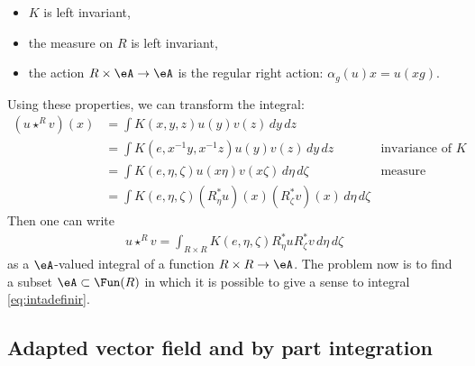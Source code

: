 \begin{itemize}
\item $K$ is left invariant,
\item the measure on $R$ is left invariant,
\item the action $R\times\eA\to\eA$ is the regular right action: $\alpha_g(u)x=u(xg)$.
\end{itemize}
Using these properties, we can transform the integral:
\[ 
  \begin{aligned}
(u\star^R v)(x)&=\int K(x,y,z)u(y)v(z)\,dy\,dz\\
		&=\int K(e,x^{-1}y,x^{-1}z)u(y)v(z)\,dy\,dz		&\textrm{invariance of $K$}\\
		&=\int K(e,\eta,\zeta)u(x\eta)v(x\zeta)\,d\eta\,d\zeta	&\textrm{measure invariance}\\
		&=\int K(e,\eta,\zeta) (R^*_{\eta}u)(x) (R^*_{\zeta}v)(x)\,d\eta\,d\zeta
\end{aligned}
\]
Then one can write
\begin{equation}  \label{eq:intadefinir}
\begin{split}
u\star^R v=\int_{R\times R} K(e,\eta,\zeta)R^*_{\eta}u R^*_{\zeta}v\,d\eta\,d\zeta
\end{split}
\end{equation}
as a $\eA$-valued integral of a function $R\times R\to\eA$. The problem now is to find a subset $\eA\subset\Fun(R)$ in which it is possible to give a sense to integral \eqref{eq:intadefinir}. 

\subsection{Adapted vector field and by part integration}

